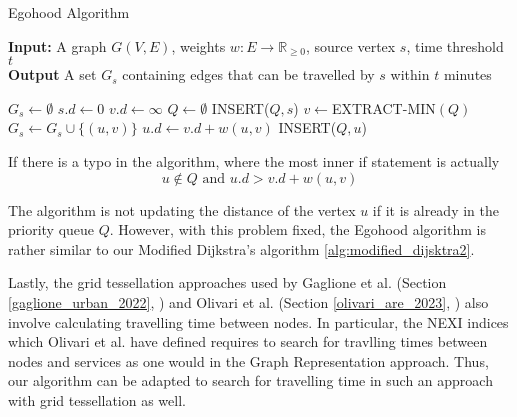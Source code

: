 \begin{algorithm}[H]
    \caption{Egohood Algorithm} \label{alg:egohood}
    \textbf{Input:} A graph $G(V,E)$, weights $w:E\rightarrow\mathbb{R}_{\geq 0}$, source vertex $s$, time threshold $t$ \\
    \textbf{Output} A set $G_s$ containing edges that can be travelled by $s$ within $t$ minutes
    \begin{algorithmic}
        \State $G_s \gets \emptyset$
        \State $s.d\gets 0$
            \State $v.d\gets\infty$
        \EndFor
        \State $Q\gets\emptyset$
        \State INSERT($Q,s$)
            \State $v\gets$EXTRACT-MIN$(Q)$
                    \State $G_s\gets G_s\cup\{(u,v)\}$
                     
                        \State $u.d\gets v.d+w(u,v)$
                        \State INSERT($Q,u$)
                    \EndIf
                \EndIf
            \EndFor
        \EndWhile
    \end{algorithmic}
\end{algorithm}

If there is a typo in the algorithm, where the most inner if statement is actually $$u\notin Q \text{ and }u.d>v.d+w(u,v)$$

The algorithm is not updating the distance of the vertex $u$ if it is already in the priority queue $Q$. However, with this problem fixed, the Egohood algorithm is rather similar to our Modified Dijkstra's algorithm \ref{alg:modified_dijsktra2}.

Lastly, the grid tessellation approaches used by Gaglione et al. (Section \ref{gaglione_urban_2022}, \cite{gaglione_urban_2022}) and Olivari et al. (Section \ref{olivari_are_2023}, \cite{olivari_are_2023}) also involve calculating travelling time between nodes. In particular, the NEXI indices which Olivari et al. have defined requires to search for travlling times between nodes and services as one would in the Graph Representation approach. Thus, our algorithm can be adapted to search for travelling time in such an approach with grid tessellation as well.